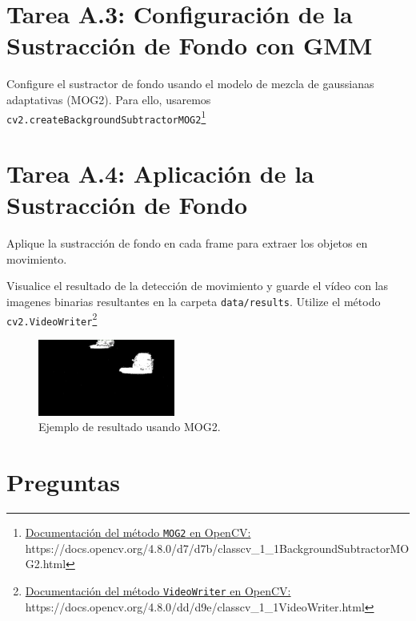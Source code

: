 \section*{Tarea A.3: Configuración de la Sustracción de Fondo con GMM}
{}

Configure el sustractor de fondo usando el modelo de mezcla de gaussianas adaptativas (MOG2). Para ello, usaremos \texttt{cv2.createBackgroundSubtractorMOG2}\footnote{ \href{https://docs.opencv.org/4.8.0/d7/d7b/classcv_1_1BackgroundSubtractorMOG2.html}{Documentación del método \texttt{MOG2} en OpenCV:} \\{https://docs.opencv.org/4.8.0/d7/d7b/classcv\_1\_1BackgroundSubtractorMOG2.html}}

\section*{Tarea A.4: Aplicación de la Sustracción de Fondo}
{}
Aplique la sustracción de fondo en cada frame para extraer los objetos en movimiento.


Visualice el resultado de la detección de movimiento y guarde el vídeo con las imagenes binarias resultantes en la carpeta \texttt{data/results}. Utilize el método \texttt{cv2.VideoWriter}\footnote{ \href{https://docs.opencv.org/4.8.0/dd/d9e/classcv_1_1VideoWriter.html}{Documentación del método \texttt{VideoWriter} en OpenCV:} \\{https://docs.opencv.org/4.8.0/dd/d9e/classcv\_1\_1VideoWriter.html}}

\begin{figure}[H]
    \centering
    \includegraphics[width=0.4\textwidth]{Lab_4/template/figures/MOG2.png}
    \caption{Ejemplo de resultado usando MOG2.}
    \label{fig:ejemplo_mog2}
\end{figure}

\section*{Preguntas}

